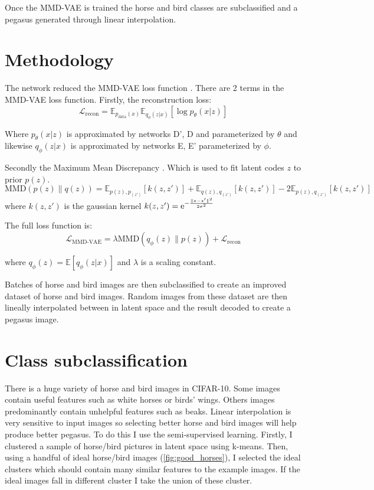 \documentclass{article}
\begin{document}
Once the MMD-VAE is trained the horse and bird classes are subclassified and a pegasus generated through linear interpolation.

\section{Methodology}
The network reduced the MMD-VAE loss function \cite{infovae}. 
There are 2 terms in the MMD-VAE loss function. Firstly, the reconstruction loss:
\begin{equation}
    \mathcal{L}_{\textrm{recon}} = \mathbb{E}_{p_{\textrm{data}}(x)} \mathbb{E}_{q_\phi (z|x)} [\log p_\theta(x|z)]
\end{equation}

Where $p_\theta(x|z)$ is approximated by networks D', D and parameterized by $\theta$ and likewise $q_\phi(z|x)$ is approximated by networks E, E' parameterized by $\phi$.


Secondly the Maximum Mean Discrepancy \cite{mmd}. Which is used to fit latent codes $z$ to prior $p(z)$.
\begin{equation}
    \textrm{MMD}(p(z) \lVert q(z)) = \mathbb{E}_{p(z), p_(z')}[k(z, z')] + \mathbb{E}_{q(z), q_(z')}[k(z, z')] - 2 \mathbb{E}_{p(z), q_(z')}[k(z, z')]
\end{equation}
where $k(z, z')$ is the gaussian kernel $k(z, z')={\rm e}^{-\frac{\lVert z-z' \rVert^2}{2\sigma^2}}$

The full loss function is:
\begin{equation}
    \mathcal{L}_\textrm{MMD-VAE} = \lambda \textrm{MMD}(q_\phi (z) \lVert p(z)) + \mathcal{L}_{\textrm{recon}}
\end{equation}

where $q_\phi(z) =  \mathbb{E}[q_\phi(z|x)]$ and $\lambda$ is a scaling constant.

Batches of horse and bird images are then subclassified to create an improved dataset of horse and bird images. Random images from these dataset are then lineally interpolated between in latent space and the result decoded to create a pegasus image. 

\section{Class subclassification}
There is a huge variety of horse and bird images in CIFAR-10. Some images contain useful features such as white horses or birds' wings. Others images predominantly contain unhelpful features such as beaks. Linear interpolation is very sensitive to input images so selecting better horse and bird images will help produce better pegasus. To do this I use the semi-supervised learning. Firstly, I clustered a sample of horse/bird pictures in latent space using k-means. Then, using a handful of ideal horse/bird images (\ref{fig:good_horses}), I selected the ideal clusters which should contain many similar features to the example images. If the ideal images fall in different cluster I take the union of these cluster.
\end{document}
